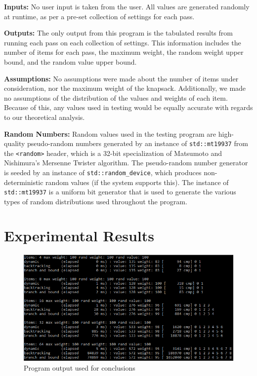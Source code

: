 \documentclass{article}
\begin{document}
\textbf{Inputs:}
No user input is taken from the user.
All values are generated randomly at runtime, as per a pre-set collection of settings for each pass.

\textbf{Outputs:}
The only output from this program is the tabulated results from running each pass on each collection of settings.
This information includes the number of items for each pass, the maximum weight, the random weight upper bound, and the random value upper bound.

\textbf{Assumptions:}
No assumptions were made about the number of items under consideration, nor the maximum weight of the knapsack.
Additionally, we made no assumptions of the distribution of the values and weights of each item.
Because of this, any values used in testing would be equally accurate with regards to our theoretical analysis.

\textbf{Random Numbers:}
Random values used in the testing program are high-quality pseudo-random numbers generated by an instance of \texttt{std::mt19937} from the \texttt{<random>} header, which is a 32-bit specialization of Matsumoto and Nishimura's Mersenne Twister algorithm.
The pseudo-random number generator is seeded by an instance of \texttt{std::random_device}, which produces non-deterministic random values (if the system supports this).
The instance of \texttt{std::mt19937} is a uniform bit generator that is used to generate the various types of random distributions used throughout the program.

\section{Experimental Results}

\FloatBarrier
\begin{figure}[!ht]
\centering
\includegraphics[width=135mm]{output.png}
\caption{Program output used for conclusions}
\end{figure}
\FloatBarrier
\end{document}
